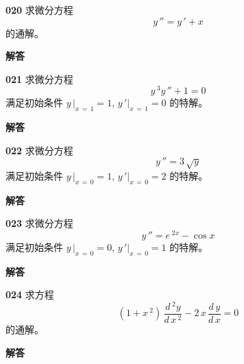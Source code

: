 \documentclass[a4paper,10pt]{article} %
\begin{document}


\textheight


\par\noindent \textbf{020} \quad 求微分方程
$$y\, '' = y\,' + x$$
的通解。
\par\noindent \textbf{ 解答}





\textheight


\par\noindent \textbf{021} \quad 求微分方程
$$y\,^3y\, ''+1 = 0$$
满足初始条件
$y\,|_{x\,=\,1}=1$, $y\,'|_{x\,=\,1}=0$
的特解。
\par\noindent \textbf{ 解答}





\textheight


\par\noindent \textbf{022} \quad 求微分方程
$$y\,'' = 3\,\sqrt{y}$$
满足初始条件
$y\,|_{x\,=\,0}=1$, $y\,'|_{x\,=\,0}=2$
的特解。
\par\noindent \textbf{ 解答}





\textheight


\par\noindent \textbf{023} \quad 求微分方程
$$y\,'' = e\,^{2x}-\cos x$$
满足初始条件
$y\,|_{x\,=\,0}=0$, $y\,'|_{x\,=\,0}=1$
的特解。
\par\noindent \textbf{ 解答}





\textheight


\par\noindent \textbf{024} \quad 求方程
$$\left(1+x\,^2\right)\,\frac{d\,^2y}{d\,x\,^2}-2\,x\,\frac{d\,y}{d\,x}=0$$
的通解。
\par\noindent \textbf{ 解答}
\end{document}
